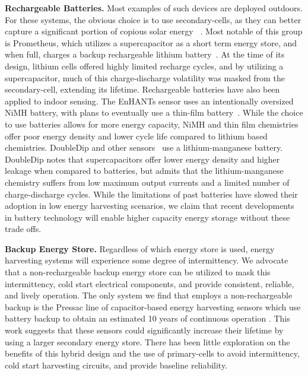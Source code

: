 \vspace{-6pt}
\noindent
\textbf{Rechargeable Batteries.}
Most examples of such devices are deployed outdoors.
For these systems, the obvious choice is to use secondary-cells, as they can
better capture a significant portion of copious solar energy
~\cite{jiang2005perpetual, kansal2007power, corke2007long, lin2005heliomote, adkins2018signpost}.
Most notable of this group is Prometheus,
which utilizes a supercapacitor as a short term energy store, and when full,
charges a backup rechargeable lithium battery~\cite{jiang2005perpetual}. At
the time of its design, lithium cells offered highly limited recharge cycles,
and by utilizing a supercapacitor, much of this
charge-discharge volatility was masked from the secondary-cell, extending its lifetime.
Rechargeable batteries have also been applied to indoor sensing.
The EnHANTs sensor uses an intentionally oversized NiMH
battery, with plans to eventually use a thin-film battery~\cite{margolies2015energy}.
While the choice to use batteries allows for more energy capacity,
NiMH and thin film chemistries offer poor
energy density and lower cycle life compared to lithium
based chemistries. DoubleDip and other sensors~\cite{martin2012doubledip,raisigel2010autonomous} use a
lithium-manganese battery.  DoubleDip notes that supercapacitors offer
lower energy density and higher leakage when compared to batteries, but admits
that the lithium-manganese chemistry suffers from low maximum output currents
and a limited number of charge-discharge cycles.
While the limitations of past batteries have slowed their adoption in
low energy harvesting scenarios, we claim that recent developments in battery
technology will enable higher capacity energy storage without these trade offs.


\vspace{-6pt}
\noindent
\textbf{Backup Energy Store.}
Regardless of which energy store is used, energy harvesting systems will
experience some degree of intermittency. We advocate that a non-rechargeable
backup energy store can be utilized to mask this intermittency, cold
start electrical components, and provide consistent, reliable, and lively operation.
The only system we find that employs a non-rechargeable
backup is the Pressac line of capacitor-based energy harvesting sensors which
use battery backup to obtain an estimated 10 years of continuous operation
\cite{pressac}.  This work suggests that these sensors could significantly
increase their lifetime by using a larger secondary energy store.
There has been little
exploration on the benefits of this hybrid design and the use of
primary-cells to avoid intermittency, cold start harvesting circuits,
and provide baseline reliability.

